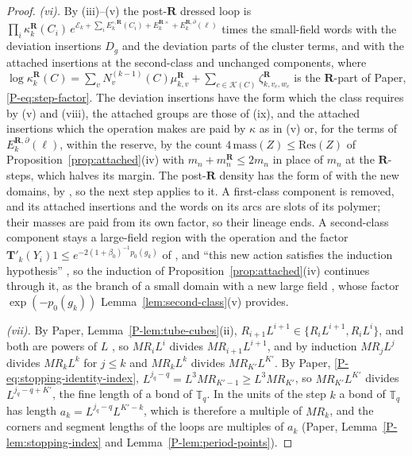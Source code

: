 \documentclass[11pt]{preprint}
\numberwithin{equation}{section}
\theoremstyle{definition}
\theoremstyle{remark}
\theoremstyle{plain}
\begin{document}
\begin{proof}
\emph{(vi).} By (iii)--(v) the post-$\mathbf R$ dressed loop is $\prod_i\kappa^{\mathbf R}_k(C_i)\,e^{\mathcal E_k + \sum_iE^{\circ,\mathbf R}_k(C_i) + E^{\mathbf R\times}_k + E^{\mathbf R,\partial}_k(\ell)}$ times the small-field words with the deviation insertions $D_g$ and the deviation parts of the cluster terms, and with the attached insertions at the second-class and unchanged components, where $\log\kappa^{\mathbf R}_k(C) = \sum_vN^{(k-1)}_v(C)\mu^{\mathbf R}_{k,v} + \sum_{c \in \mathcal K(C)}\zeta^{\mathbf R}_{k,v_c,w_c}$ is the $\mathbf R$-part of Paper, \eqref{P-eq:step-factor}. The deviation insertions have the form which the class requires by (v) and (viii), the attached groups are those of (ix), and the attached insertions which the operation makes are paid by $\kappa$ as in (v) or, for the terms of $E^{\mathbf R,\partial}_k(\ell)$, within the reserve, by the count $4\,\mathrm{mass}(Z) \leq \mathrm{Res}(Z)$ of Proposition~\ref{prop:attached}(iv) with $m_n + m^{\mathbf R}_n \leq 2m_n$ in place of $m_n$ at the $\mathbf R$-steps, which halves its margin. The post-$\mathbf R$ density has the form of \cite[Sect.~2]{BalabanCRE} with the new domains, by \cite[Theorem~1, p.~355]{BalabanLFR2}, so the next step applies to it. A first-class component is removed, and its attached insertions and the words on its arcs are slots of its polymer; their masses are paid from its own factor, so their lineage ends. A second-class component stays a large-field region with the operation \cite[(1.102), p.~390]{BalabanLFR2} and the factor $\mathbf T'_k(Y_i)1 \leq e^{-2(1+\beta_0)^{-1}p_0(g_k)}$ of \cite[(1.89)]{BalabanLFR2}, and ``this new action satisfies the induction hypothesis'' \cite[p.~390]{BalabanLFR2}, so the induction of Proposition~\ref{prop:attached}(iv) continues through it, as the branch of a small domain with a new large field \cite[pp.~385--386]{BalabanLFR2}, whose factor $\exp(-p_0(g_k))$ Lemma~\ref{lem:second-class}(v) provides.

\emph{(vii).} By Paper, Lemma~\ref{P-lem:tube-cubes}(ii), $R_{i+1}L^{i+1} \in \{R_iL^{i+1}, R_iL^i\}$, and both are powers of $L$ \cite[p.~245; (2.5), p.~255]{BalabanCRE}, so $MR_iL^i$ divides $MR_{i+1}L^{i+1}$, and by induction $MR_jL^j$ divides $MR_kL^k$ for $j \leq k$ and $MR_kL^k$ divides $MR_{K'}L^{K'}$. By Paper, \eqref{P-eq:stopping-identity-index}, $L^{j_q-q} = L^3MR_{K'-1} \geq L^3MR_{K'}$, so $MR_{K'}L^{K'}$ divides $L^{j_q-q+K'}$, the fine length of a bond of $\mathbb T_q$. In the units of the step $k$ a bond of $\mathbb T_q$ has length $a_k = L^{j_q-q}L^{K'-k}$, which is therefore a multiple of $MR_k$, and the corners and segment lengths of the loops are multiples of $a_k$ (Paper, Lemma~\ref{P-lem:stopping-index} and Lemma~\ref{P-lem:period-points}).


\end{proof}
\end{document}
